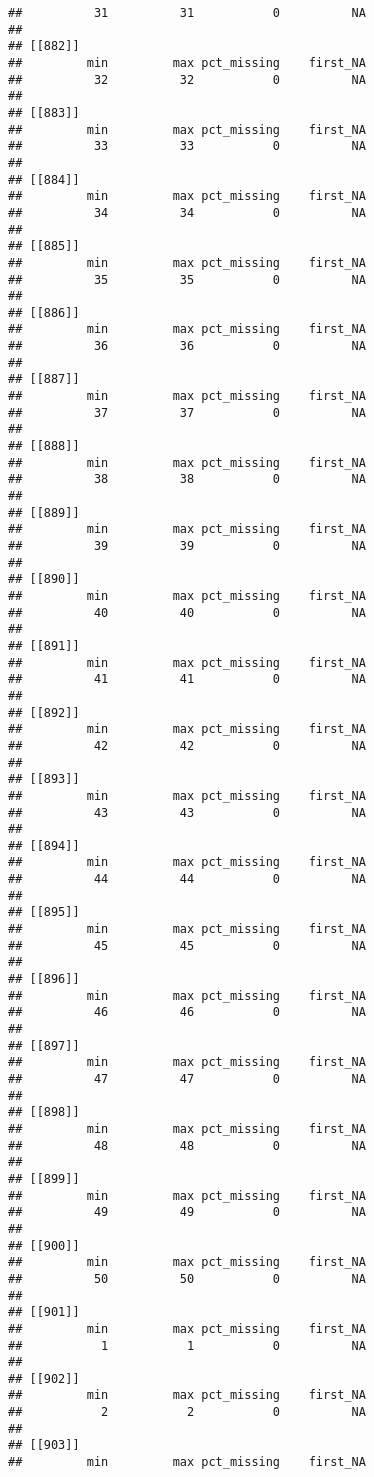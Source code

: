 \documentclass[
]{article}
\begin{document}
\begin{verbatim}
##          31          31           0          NA 
## 
## [[882]]
##         min         max pct_missing    first_NA 
##          32          32           0          NA 
## 
## [[883]]
##         min         max pct_missing    first_NA 
##          33          33           0          NA 
## 
## [[884]]
##         min         max pct_missing    first_NA 
##          34          34           0          NA 
## 
## [[885]]
##         min         max pct_missing    first_NA 
##          35          35           0          NA 
## 
## [[886]]
##         min         max pct_missing    first_NA 
##          36          36           0          NA 
## 
## [[887]]
##         min         max pct_missing    first_NA 
##          37          37           0          NA 
## 
## [[888]]
##         min         max pct_missing    first_NA 
##          38          38           0          NA 
## 
## [[889]]
##         min         max pct_missing    first_NA 
##          39          39           0          NA 
## 
## [[890]]
##         min         max pct_missing    first_NA 
##          40          40           0          NA 
## 
## [[891]]
##         min         max pct_missing    first_NA 
##          41          41           0          NA 
## 
## [[892]]
##         min         max pct_missing    first_NA 
##          42          42           0          NA 
## 
## [[893]]
##         min         max pct_missing    first_NA 
##          43          43           0          NA 
## 
## [[894]]
##         min         max pct_missing    first_NA 
##          44          44           0          NA 
## 
## [[895]]
##         min         max pct_missing    first_NA 
##          45          45           0          NA 
## 
## [[896]]
##         min         max pct_missing    first_NA 
##          46          46           0          NA 
## 
## [[897]]
##         min         max pct_missing    first_NA 
##          47          47           0          NA 
## 
## [[898]]
##         min         max pct_missing    first_NA 
##          48          48           0          NA 
## 
## [[899]]
##         min         max pct_missing    first_NA 
##          49          49           0          NA 
## 
## [[900]]
##         min         max pct_missing    first_NA 
##          50          50           0          NA 
## 
## [[901]]
##         min         max pct_missing    first_NA 
##           1           1           0          NA 
## 
## [[902]]
##         min         max pct_missing    first_NA 
##           2           2           0          NA 
## 
## [[903]]
##         min         max pct_missing    first_NA 

\end{verbatim}
\end{document}
